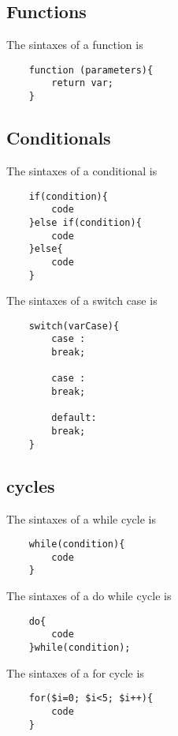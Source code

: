 \subsection{Functions}
The sintaxes of a function is
\begin{lstlisting}
	function (parameters){
		return var;
	}
\end{lstlisting}

\subsection{Conditionals}
The sintaxes of a conditional is
\begin{lstlisting}
	if(condition){
		code
	}else if(condition){
		code
	}else{
		code
	}
\end{lstlisting}

The sintaxes of a switch case is

\begin{lstlisting}
	switch(varCase){
		case :
		break;
		
		case :
		break;
		
		default:
		break;
	}
\end{lstlisting}

\subsection{cycles}

The sintaxes of a while cycle is

\begin{lstlisting}
	while(condition){
		code
	}
\end{lstlisting}

The sintaxes of a do while cycle is

\begin{lstlisting}
	do{
		code
	}while(condition);
\end{lstlisting}

The sintaxes of a for cycle is

\begin{lstlisting}
	for($i=0; $i<5; $i++){
		code
	}
\end{lstlisting}

